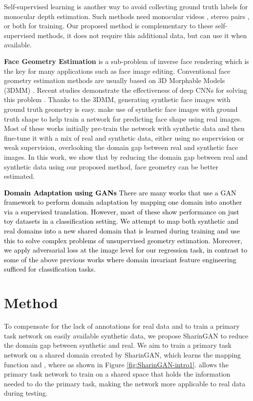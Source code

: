 \documentclass[10pt,twocolumn,letterpaper]{article}
\newcommand{\camready}[1]{\textcolor{black}{#1}}
\begin{document}
Self-supervised learning is another way to avoid collecting ground truth labels for monocular depth estimation. 
Such methods need monocular videos \cite{Zhou_2017_CVPR,Wang_2018_CVPR,AAAI_depth,Godard_2019_ICCV}, stereo pairs \cite{monodepth17,Mehta_2018,Poggi_2018,ma2018self}, or both\cite{Godard_2019_ICCV} for training. 
Our proposed method is complementary to these self-supervised methods, it does not require this additional data, but can use it when available.


\textbf{Face Geometry Estimation} is a sub-problem of inverse face rendering which is the key for many applications such as face image editing.
Conventional face geometry estimation methods are usually based on 3D Morphable Models (3DMM) \cite{3DMM}.
Recent studies demonstrate the effectiveness of deep CNNs for solving this problem \cite{Mofa,NeuralFace,3DMM_kyle,SfSNet,Luan_3DMM,tran2019towards,liu20193d}.
Thanks to the 3DMM, generating synthetic face images with ground truth geometry is easy. 
\cite{Mofa,NeuralFace,SfSNet} make use of synthetic face images with ground truth shape to help train a network for predicting face shape using real images.
Most of these works initially pre-train the network with synthetic data and then fine-tune it with a mix of real and synthetic data, either using no supervision or weak supervision, overlooking the domain gap between real and synthetic face images.
In this work, we show that by reducing the domain gap between real and synthetic data using our proposed method, face geometry can be better estimated.


\camready{\textbf{Domain Adaptation using GANs} There are many works \cite{Tzeng_2017_CVPR,Bousmalis_2017_CVPR,CoGAN,taigman2016unsupervised,shen2017wasserstein} that use a GAN framework to perform domain adaptation by mapping one domain into another via a supervised translation. However, most of these show performance on just toy datasets in a classification setting. We attempt to map both synthetic and real domains into a new shared domain that is learned during training and use this to solve complex problems of unsupervised geometry estimation. Moreover, we apply adversarial loss at the image level for our regression task, in contrast to some of the above previous works where domain invariant feature engineering sufficed for classification tasks.}

\section{Method}
To compensate for the lack of annotations for real data and to train a primary task network on easily available synthetic data, we propose SharinGAN to reduce the domain gap between synthetic and real. We aim to train a primary task network on a shared domain created by SharinGAN, which learns the mapping function  and  , where  as shown in Figure \ref{fig:SharinGAN-intro1}. 
 allows the primary task network to train on a shared space that holds the information needed to do the primary task, making the network more applicable to real data during testing.
\end{document}

